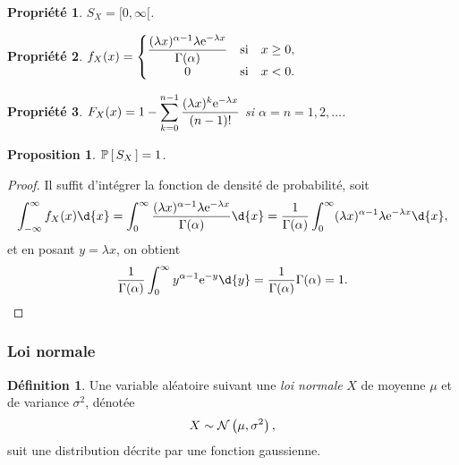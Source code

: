 \documentclass[11pt]{article}
\makeatletter
\renewcommand\P[1]{%
	\ensuremath{%
		\mathbb{P}\left[\,#1\,\right]%
	}%
}%
\newcommand\e{%
	\ensuremath{%
		\mathrm{e}%
	}%
}%
\newcommand\Norm[2]{%
	\ensuremath{%
		\mathcal{N}\left(#1,#2\right)%
	}%
}%
\newtheorem*{proposition}{Proposition}
\newtheorem{property}{Propriété}
\theoremstyle{remark}
\theoremstyle{definition}
\newtheorem*{@definition}{Définition}
\newenvironment{definition}{%
	\begin{@definition}%
}{%
	\end{@definition}%
	\setcounter{property}{0}%
}
\makeatother
\begin{document}
\begin{property}
	$S_X=[0,\infty[$.
\end{property}

\begin{property}
	$f_X(x)=\left\{
		\begin{matrix}
			\dfrac{(\lambda x)^{\alpha-1}\lambda\e^{-\lambda x}}
				{\Gamma(\alpha)} & \text{si} & x\geq 0,\\
			0                    & \text{si} & x<0.\\
		\end{matrix}
	\right.$
\end{property}

\begin{property}
	$F_X(x)=1-\displaystyle\sum_{k=0}^{n-1}\frac{(\lambda x)^k\e^{-\lambda x}}
		{(n-1)!}$ si $\alpha=n=1,2,\dots$.
\end{property}

\begin{proposition}
	$\P{S_X}=1$.
\end{proposition}

\begin{proof}
	Il suffit d'intégrer la fonction de densité de probabilité, soit
	\begin{equation*}
		\int_{-\infty}^\infty f_X(x)\d{x}
		=\int_0^\infty\frac{(\lambda x)^{\alpha-1}\lambda\e^{-\lambda x}}
			{\Gamma(\alpha)}\d{x}
		=\frac{1}{\Gamma(\alpha)}\int_0^\infty(\lambda x)^{\alpha-1}
			\lambda\e^{-\lambda x}\d{x},
	\end{equation*}
	et en posant $y=\lambda x$, on obtient
	\begin{equation*}
		\frac{1}{\Gamma(\alpha)}\int_0^\infty y^{\alpha-1}\e^{-y}\d{y}
		=\frac{1}{\Gamma(\alpha)}\Gamma{(\alpha)}=1.\qedhere
	\end{equation*}
\end{proof}

\subsubsection{Loi normale}
\begin{definition}
	Une variable aléatoire suivant une \textit{loi normale} $X$ de moyenne
	$\mu$ et de variance $\sigma^2$, dénotée
	\begin{equation*}
		X\sim\Norm{\mu}{\sigma^2},
	\end{equation*}
	suit une distribution décrite par une fonction gaussienne.
\end{definition}
\end{document}
